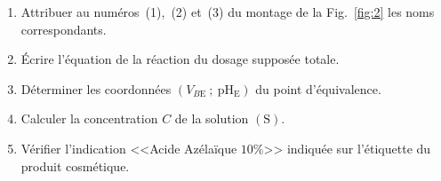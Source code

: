 \begin{enumerate}
    \item Attribuer au numéros~(1),~(2) et~(3) du montage de la Fig.~\ref{fig:2}
          les noms correspondants.
    \item Écrire l'équation de la réaction du dosage supposée totale.
    \item Déterminer les coordonnées $(V_{B\mathrm{E}}~;~\mathrm{pH_{E}})$ du
          point d'équivalence.
    \item Calculer la concentration $C$ de la solution $\mathrm{(S)}$.
    \item Vérifier l'indication <<Acide Azélaïque $10\%$>> indiquée sur
          l'étiquette du produit cosmétique.
\end{enumerate}

